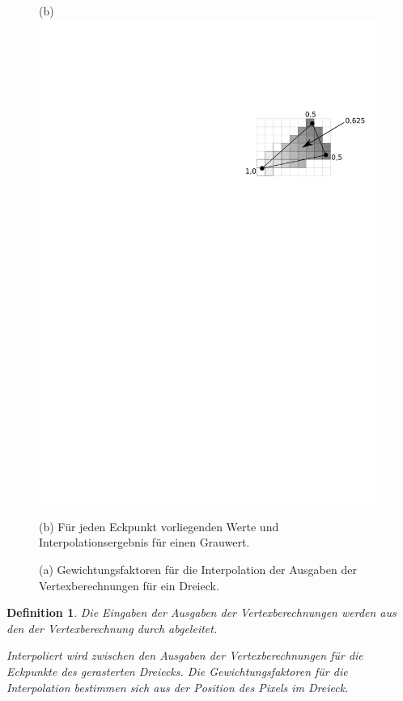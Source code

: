 \documentclass[twoside,a4paper,fleqn,12pt]{book}
\newtheorem{defn}{Definition}
\begin{document}
\begin{figure}[h]
  (b) \includegraphics[scale=0.8]{triraster_values}
  \caption{(a) Gewichtungsfaktoren für die Interpolation der Ausgaben der Vertexberechnungen für ein Dreieck.}
  \small (b) Für jeden Eckpunkt vorliegenden Werte und Interpolationsergebnis für einen Grauwert.
  \label{fig:triraster_lerp}
\end{figure}


\begin{defn}
Die Eingaben der Ausgaben der Vertexberechnungen werden aus den der Vertexberechnung durch 
abgeleitet.

Interpoliert wird zwischen den Ausgaben der Vertexberechnungen für die Eckpunkte des gerasterten Dreiecks.
Die Gewichtungsfaktoren für die Interpolation bestimmen sich aus der Position des Pixels im Dreieck.
\end{defn}
\end{document}
